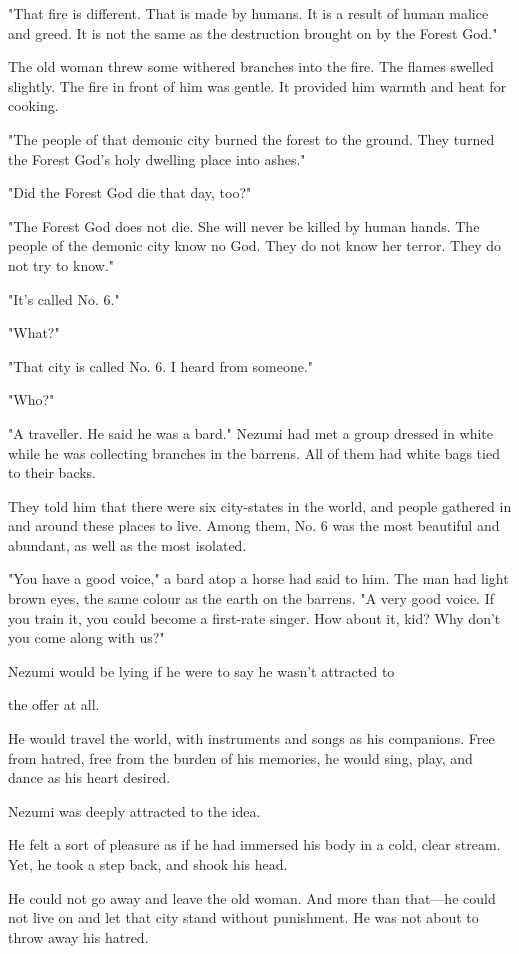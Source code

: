 "That fire is different. That is made by humans. It is a result of human
malice and greed. It is not the same as the destruction brought on by
the Forest God."

The old woman threw some withered branches into the fire. The flames
swelled slightly. The fire in front of him was gentle. It provided him
warmth and heat for cooking.

"The people of that demonic city burned the forest to the ground. They
turned the Forest God's holy dwelling place into ashes."

"Did the Forest God die that day, too?"

"The Forest God does not die. She will never be killed by human hands.
The people of the demonic city know no God. They do not know her terror.
They do not try to know."

"It's called No. 6."

"What?"

"That city is called No. 6. I heard from someone."

"Who?"

"A traveller. He said he was a bard." Nezumi had met a group dressed in
white while he was collecting branches in the barrens. All of them had
white bags tied to their backs.

They told him that there were six city-states in the world, and people
gathered in and around these places to live. Among them, No. 6 was the
most beautiful and abundant, as well as the most isolated.

"You have a good voice," a bard atop a horse had said to him. The man
had light brown eyes, the same colour as the earth on the barrens. "A
very good voice. If you train it, you could become a first-rate singer.
How about it, kid? Why don't you come along with us?"

Nezumi would be lying if he were to say he wasn't attracted to~

the offer at all.

He would travel the world, with instruments and songs as his companions.
Free from hatred, free from the burden of his memories, he would sing,
play, and dance as his heart desired.

Nezumi was deeply attracted to the idea.

He felt a sort of pleasure as if he had immersed his body in a cold,
clear stream. Yet, he took a step back, and shook his head.

He could not go away and leave the old woman. And more than that---he
could not live on and let that city stand without punishment. He was not
about to throw away his hatred.

